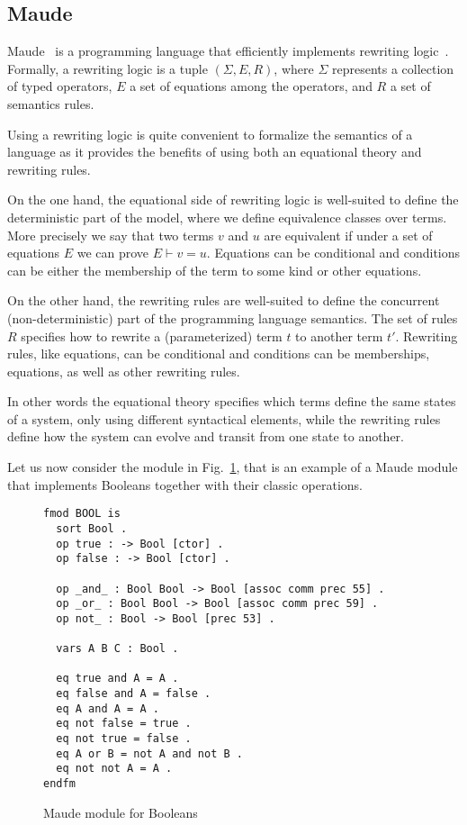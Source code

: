 \documentclass{article}[12pt,a4paper]
\theoremstyle{definition}
\begin{document}

\subsection{Maude}\label{sec:maude}

Maude~\cite{maude} is a programming language that efficiently implements rewriting logic~\cite{MeseguerMS96}.
Formally, a rewriting logic is a tuple $(\Sigma, E, R)$, where $\Sigma$
represents a collection of typed operators, $E$ a set of equations among the operators, and $R$ a set of
semantics rules.

Using a rewriting logic is quite convenient to formalize the
semantics of a language as it provides the benefits of using both an equational theory and rewriting rules.

On the one hand, the equational side of rewriting logic is well-suited to define the deterministic part of the model, where
we define equivalence classes over terms. More precisely we say that two terms
$v$ and $u$ are equivalent if under a set of equations $E$ we can prove $E \vdash
v = u$. Equations can be conditional and conditions can be either the
membership of the term to some kind or other equations.

On the other hand, the rewriting rules are well-suited to define the
concurrent (non-deterministic) part of the programming language
semantics. The set of rules $R$ specifies how to rewrite a
(parameterized) term $t$ to another term $t'$.  Rewriting rules, like
equations, can be conditional and conditions can be
memberships, equations, as well as other rewriting rules.

In other words the equational theory specifies which terms define the same states
of a system, only using different syntactical elements, while the rewriting rules
define how the system can evolve and transit from one state to another.

Let us now consider the module in Fig.~\ref{fig:bool}, that is an example of a Maude module that implements Booleans together with their classic operations.

\begin{figure}[t]
\begin{verbatim}
fmod BOOL is
  sort Bool .
  op true : -> Bool [ctor] .
  op false : -> Bool [ctor] .

  op _and_ : Bool Bool -> Bool [assoc comm prec 55] .
  op _or_ : Bool Bool -> Bool [assoc comm prec 59] .
  op not_ : Bool -> Bool [prec 53] .

  vars A B C : Bool .

  eq true and A = A .
  eq false and A = false .
  eq A and A = A .
  eq not false = true .
  eq not true = false .
  eq A or B = not A and not B .
  eq not not A = A .
endfm
\end{verbatim}
\caption{Maude module for Booleans}\label{fig:bool}
\end{figure}
\end{document}
